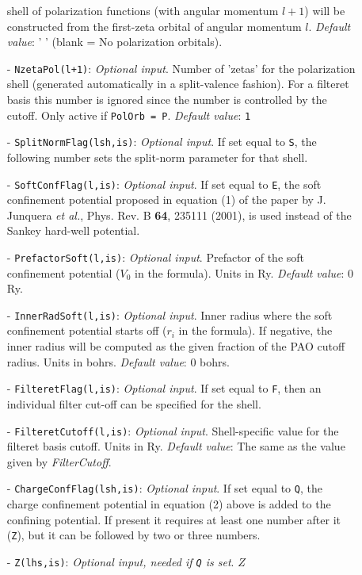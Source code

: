 \begin{description}
\begin{itemize}
shell of
polarization functions (with angular momentum $l+1$)  will be constructed
from the first-zeta orbital of angular momentum $l$. \textit{Default value}: ' '
(blank = No polarization orbitals).
\item[-] \texttt{NzetaPol(l+1)}: \textit{Optional input}. Number of
'zetas' for the
polarization shell (generated automatically in a split-valence fashion).
For a filteret basis this number is ignored since the number is controlled
by the cutoff.
Only active if \texttt{PolOrb = P}. \textit{Default value}: \texttt{1}
\item[-] \texttt{SplitNormFlag(lsh,is)}:
\textit{Optional input}. If set equal to
\texttt{S}, the following number sets the split-norm parameter for that shell.
\item[-] \texttt{SoftConfFlag(l,is)}:
\textit{Optional input}. If set equal to
\texttt{E}, the soft confinement potential proposed in equation (1) of
the paper by J. Junquera \textit{et al.}, Phys. Rev. B \textbf{64}, 235111 (2001),
is used instead of the Sankey hard-well potential.
\item[-] \texttt{PrefactorSoft(l,is)}: \textit{Optional input}. Prefactor
of the soft confinement potential ($V_{0}$ in the formula). Units in Ry.
\textit{Default value}: 0 Ry.
\item[-] \texttt{InnerRadSoft(l,is)}: \textit{Optional input}. Inner radius where
the soft confinement potential starts off ($r_{i}$ in the formula).
If negative, the inner radius will be computed as the given fraction
of the PAO cutoff radius.
Units in bohrs. \textit{Default value}: 0 bohrs.
\item[-] \texttt{FilteretFlag(l,is)}:
\textit{Optional input}. If set equal to
\texttt{F}, then an individual filter cut-off can be specified for the shell.
\item[-] \texttt{FilteretCutoff(l,is)}: \textit{Optional input}. Shell-specific
value for the filteret basis cutoff. Units in Ry.
\textit{Default value}: The same as the value given by \textit{FilterCutoff}.
\item[-] \texttt{ChargeConfFlag(lsh,is)}: \textit{Optional input}. If set equal to 
\texttt{Q}, the charge confinement potential in equation (2) above is
added to the confining potential. If present it requires at least
one number after it (\texttt{Z}), but it can be followed by two or three numbers.
\item[-] \texttt{Z(lhs,is)}: \textit{Optional input, needed if \texttt{Q} is set}. $Z$

\end{itemize}
\end{description}
